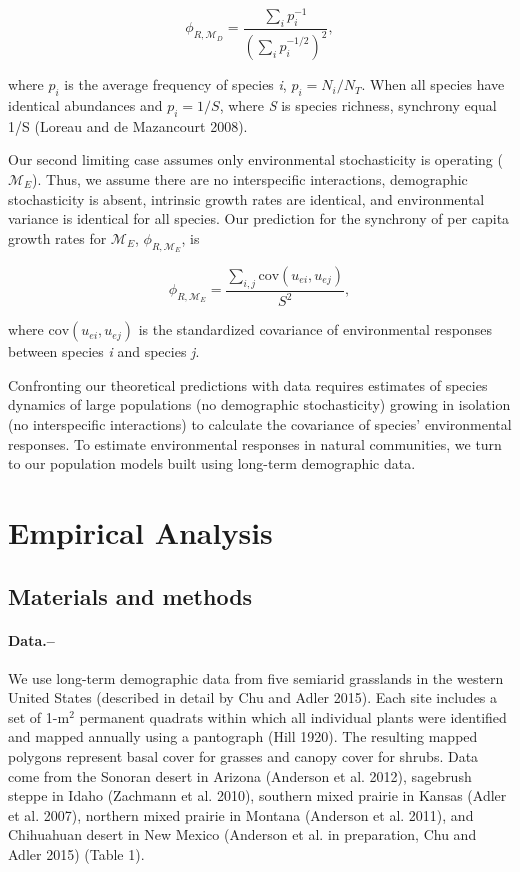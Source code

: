 \documentclass[12pt,]{article}
\begin{document}
\begin{equation}
\phi_{R,\mathcal{M}_{D}} = \frac{\sum_i p_i^{-1}}{\left(\sum_i p_i^{-1/2} \right)^2},
\end{equation}

\noindent where \(p_i\) is the average frequency of species \emph{i},
\(p_i = N_i/N_T\). When all species have identical abundances and
\(p_i = 1/S\), where \emph{S} is species richness, synchrony equal 1/S
(Loreau and {{de Mazancourt}} 2008).

Our second limiting case assumes only environmental stochasticity is
operating (\(\mathcal{M}_{E}\)). Thus, we assume there are no
interspecific interactions, demographic stochasticity is absent,
intrinsic growth rates are identical, and environmental variance is
identical for all species. Our prediction for the synchrony of per
capita growth rates for \(\mathcal{M}_{E}\),
\(\phi_{R,\mathcal{M}_{E}}\), is

\begin{equation}
\phi_{R,\mathcal{M}_{E}} = \frac{\sum_{i,j}\text{cov}(u_{ei},u_{ej})}{S^2},
\end{equation}

\noindent{} where \(\text{cov}(u_{ei},u_{ej})\) is the standardized
covariance of environmental responses between species \emph{i} and
species \emph{j}.

Confronting our theoretical predictions with data requires estimates of
species dynamics of large populations (no demographic stochasticity)
growing in isolation (no interspecific interactions) to calculate the
covariance of species' environmental responses. To estimate
environmental responses in natural communities, we turn to our
population models built using long-term demographic data.

\section{Empirical Analysis}\subsection{Materials and methods}

\paragraph{Data.--}\label{data.}

We use long-term demographic data from five semiarid grasslands in the
western United States (described in detail by Chu and Adler 2015). Each
site includes a set of 1-\(\text{m}^2\) permanent quadrats within which
all individual plants were identified and mapped annually using a
pantograph (Hill 1920). The resulting mapped polygons represent basal
cover for grasses and canopy cover for shrubs. Data come from the
Sonoran desert in Arizona (Anderson et al. 2012), sagebrush steppe in
Idaho (Zachmann et al. 2010), southern mixed prairie in Kansas (Adler et
al. 2007), northern mixed prairie in Montana (Anderson et al. 2011), and
Chihuahuan desert in New Mexico (Anderson et al. in preparation, Chu and
Adler 2015) (Table 1).
\end{document}
